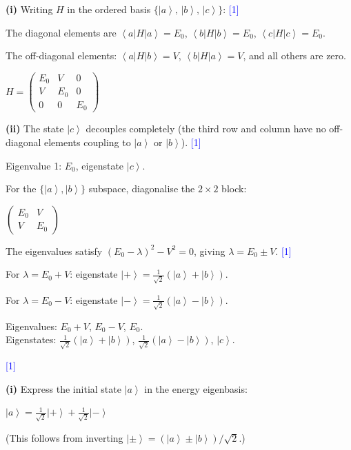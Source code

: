 \documentclass[12pt,a4paper]{article}
\newcommand{\markstep}[1]{\hfill\textcolor{blue}{[#1]}}
\newcommand{\finalanswer}[1]{%
  \begin{tcolorbox}[colback=green!5!white,colframe=green!50!black,boxrule=0.5pt]
  #1
  \end{tcolorbox}
}
\renewcommand{\ket}[1]{\left|#1\right\rangle}
\renewcommand{\bra}[1]{\left\langle #1\right|}
\begin{document}
\begin{parts}

\item

\textbf{(i)} Writing $H$ in the ordered basis $\{\ket{a},\,\ket{b},\,\ket{c}\}$: \markstep{1}

The diagonal elements are $\bra{a}H\ket{a} = E_0$, $\bra{b}H\ket{b} = E_0$, $\bra{c}H\ket{c} = E_0$.

The off-diagonal elements: $\bra{a}H\ket{b} = V$, $\bra{b}H\ket{a} = V$, and all others are zero.

\finalanswer{$H = \begin{pmatrix} E_0 & V & 0 \\ V & E_0 & 0 \\ 0 & 0 & E_0 \end{pmatrix}$}

\textbf{(ii)} The state $\ket{c}$ decouples completely (the third row and column have no off-diagonal elements coupling to $\ket{a}$ or $\ket{b}$). \markstep{1}

Eigenvalue 1: $E_0$, eigenstate $\ket{c}$.

For the $\{\ket{a},\ket{b}\}$ subspace, diagonalise the $2\times 2$ block:

$\begin{pmatrix} E_0 & V \\ V & E_0 \end{pmatrix}$

The eigenvalues satisfy $(E_0 - \lambda)^2 - V^2 = 0$, giving $\lambda = E_0 \pm V$. \markstep{1}

For $\lambda = E_0 + V$: eigenstate $\ket{+} = \frac{1}{\sqrt{2}}(\ket{a} + \ket{b})$.

For $\lambda = E_0 - V$: eigenstate $\ket{-} = \frac{1}{\sqrt{2}}(\ket{a} - \ket{b})$.

\finalanswer{Eigenvalues: $E_0 + V$, $E_0 - V$, $E_0$. \\ Eigenstates: $\frac{1}{\sqrt{2}}(\ket{a}+\ket{b})$, $\frac{1}{\sqrt{2}}(\ket{a}-\ket{b})$, $\ket{c}$.} \markstep{1}

\item

\textbf{(i)} Express the initial state $\ket{a}$ in the energy eigenbasis:

$\ket{a} = \frac{1}{\sqrt{2}}\ket{+} + \frac{1}{\sqrt{2}}\ket{-}$

(This follows from inverting $\ket{\pm} = (\ket{a}\pm\ket{b})/\sqrt{2}$.)


\end{parts}
\end{document}
